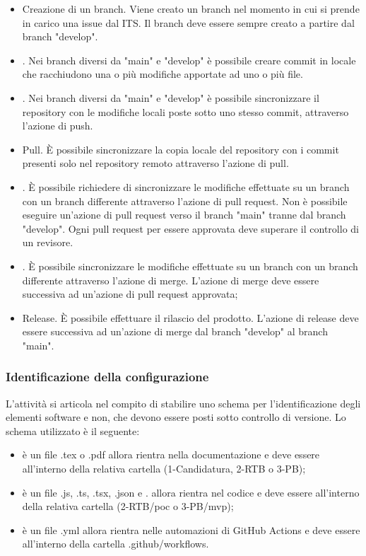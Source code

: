 \begin{itemize}
    \item Creazione di un branch. Viene creato un branch nel momento in cui si prende in carico una issue dal ITS. Il branch deve essere sempre creato a partire dal branch "develop".
    \item {}. Nei branch diversi da "main" e "develop" è possibile creare commit in locale che racchiudono una o più modifiche apportate ad uno o più file.
    \item {}. Nei branch diversi da "main" e "develop" è possibile sincronizzare il repository con le modifiche locali poste sotto uno stesso commit, attraverso l'azione di push.
    \item Pull. È possibile sincronizzare la copia locale del repository con i commit presenti solo nel repository remoto attraverso l'azione di pull.
    \item {}. È possibile richiedere di sincronizzare le modifiche effettuate su un branch con un branch differente attraverso l'azione di pull request. Non è possibile eseguire un'azione di pull request verso il branch "main" tranne dal branch "develop". Ogni pull request per essere approvata deve superare il controllo di un revisore. 
    \item {}. È possibile sincronizzare le modifiche effettuate su un branch con un branch differente attraverso l'azione di merge. L'azione di merge deve essere successiva ad un'azione di pull request approvata;
    \item Release. È possibile effettuare il rilascio del prodotto. L'azione di release deve essere successiva ad un'azione di merge dal branch "develop" al branch "main". 
\end{itemize}

\subsubsection{Identificazione della configurazione}
L'attività si articola nel compito di stabilire uno schema per l'identificazione degli elementi software e non, che devono essere posti sotto controllo di versione. Lo schema utilizzato è il seguente:
\begin{itemize}
    \item è un file .tex o .pdf allora rientra nella documentazione e deve essere all'interno della relativa cartella (1-Candidatura, 2-RTB o 3-PB);
    \item è un file .js, .ts, .tsx, .json e . allora rientra nel codice e deve essere all'interno della relativa cartella (2-RTB/poc o 3-PB/mvp);
    \item è un file .yml allora rientra nelle automazioni di GitHub Actions e deve essere all'interno della cartella .github/workflows.
\end{itemize}

